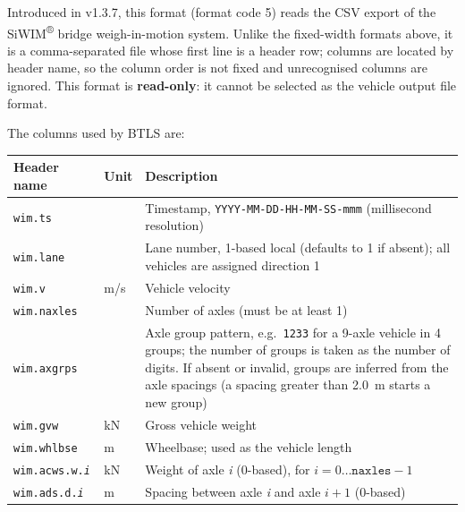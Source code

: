 \documentclass[
]{article}
\begin{document}
Introduced in v1.3.7, this format (format code 5) reads the CSV export
of the SiWIM\textsuperscript{®} bridge weigh-in-motion system. Unlike
the fixed-width formats above, it is a comma-separated file whose
first line is a header row; columns are located by header name, so the
column order is not fixed and unrecognised columns are ignored. This
format is \textbf{read-only}: it cannot be selected as the vehicle
output file format.

The columns used by BTLS are:

\begin{longtable}[]{@{}
  >{\raggedright\arraybackslash}p{}
  >{\raggedright\arraybackslash}p{}
  >{\raggedright\arraybackslash}p{}@{}}
\toprule\noalign{}
\begin{minipage}[b]{\linewidth}\raggedright
\textbf{Header name}
\end{minipage} & \begin{minipage}[b]{\linewidth}\raggedright
\textbf{Unit}
\end{minipage} & \begin{minipage}[b]{\linewidth}\raggedright
\textbf{Description}
\end{minipage} \\
\midrule\noalign{}
\endhead
\bottomrule\noalign{}
\endlastfoot
\texttt{wim.ts} & & Timestamp, \texttt{YYYY-MM-DD-HH-MM-SS-mmm}
(millisecond resolution) \\
\texttt{wim.lane} & & Lane number, 1-based local (defaults to 1 if
absent); all vehicles are assigned direction 1 \\
\texttt{wim.v} & m/s & Vehicle velocity \\
\texttt{wim.naxles} & & Number of axles (must be at least 1) \\
\texttt{wim.axgrps} & & Axle group pattern, e.g.\ \texttt{1233} for a
9-axle vehicle in 4 groups; the number of groups is taken as the
number of digits. If absent or invalid, groups are inferred from the
axle spacings (a spacing greater than 2.0~m starts a new group) \\
\texttt{wim.gvw} & kN & Gross vehicle weight \\
\texttt{wim.whlbse} & m & Wheelbase; used as the vehicle length \\
\texttt{wim.acws.w.\emph{i}} & kN & Weight of axle \emph{i}
(0-based), for $i = 0 \ldots \texttt{naxles}-1$ \\
\texttt{wim.ads.d.\emph{i}} & m & Spacing between axle \emph{i} and
axle $i+1$ (0-based) \\
\end{longtable}
\end{document}
